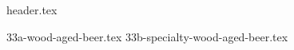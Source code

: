 \clearpage
{}
\divisorLine
{header.tex}
\begin{multicols}{2}
{33a-wood-aged-beer.tex}
{33b-specialty-wood-aged-beer.tex}
\end{multicols}